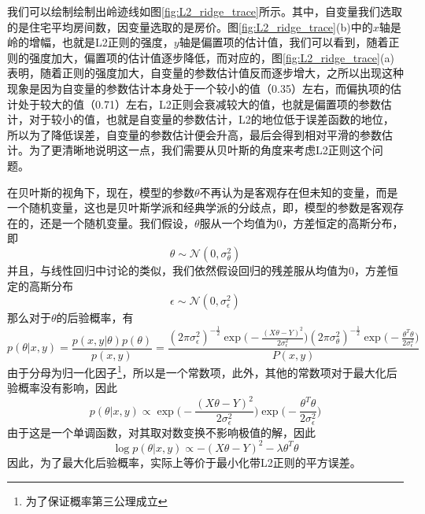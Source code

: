 

我们可以绘制绘制出岭迹线如图\ref{fig:L2_ridge_trace}所示。其中，自变量我们选取的是住宅平均房间数，因变量选取的是房价。图\ref{fig:L2_ridge_trace}(b)中的$x$轴是岭的增幅，也就是L2正则的强度，$y$轴是偏置项的估计值，我们可以看到，随着正则的强度加大，偏置项的估计值逐步降低，而对应的，图\ref{fig:L2_ridge_trace}(a)表明，随着正则的强度加大，自变量的参数估计值反而逐步增大，之所以出现这种现象是因为自变量的参数估计本身处于一个较小的值（0.35）左右，而偏执项的估计处于较大的值（0.71）左右，L2正则会衰减较大的值，也就是偏置项的参数估计，对于较小的值，也就是自变量的参数估计，L2的地位低于误差函数的地位，所以为了降低误差，自变量的参数估计便会升高，最后会得到相对平滑的参数估计。为了更清晰地说明这一点，我们需要从贝叶斯的角度来考虑L2正则这个问题。

在贝叶斯的视角下，现在，模型的参数$\theta$不再认为是客观存在但未知的变量，而是一个随机变量，这也是贝叶斯学派和经典学派的分歧点，即，模型的参数是客观存在的，还是一个随机变量。我们假设，$\theta$服从一个均值为0，方差恒定的高斯分布，即
\begin{equation}
	\theta \sim \mathcal{N}(0, \sigma_\theta^2)
\end{equation}
并且，与线性回归中讨论的类似，我们依然假设回归的残差服从均值为0，方差恒定的高斯分布
\begin{equation}
	\epsilon \sim \mathcal{N}(0, \sigma_\epsilon^2)
\end{equation}
那么对于$\theta$的后验概率，有
\begin{equation}
	p(\theta|x, y) = \frac{p(x, y| \theta)p(\theta)}{p(x, y)} 
	= \frac{(2\pi\sigma_\epsilon^2)^{-\frac{1}{2}}\exp\Big(-\frac{(X\theta - Y)^2}{2\sigma_\epsilon^2}\Big)
	(2\pi\sigma_\theta^2)^{-\frac{1}{2}}\exp\Big(-\frac{\theta^T\theta}{2\sigma_\epsilon^2}\Big)
	}{P(x, y)}
\end{equation}
由于分母为归一化因子\footnote{为了保证概率第三公理成立}，所以是一个常数项，此外，其他的常数项对于最大化后验概率没有影响，因此
\begin{equation}
	p(\theta|x, y) \propto
	\exp\Big(-\frac{(X\theta - Y)^2}{2\sigma_\epsilon^2}\Big)
	\exp\Big(-\frac{\theta^T\theta}{2\sigma_\epsilon^2}\Big)
\end{equation}
由于这是一个单调函数，对其取对数变换不影响极值的解，因此
\begin{equation}
	\log p(\theta|x, y) \propto
	-(X\theta - Y)^2
	-\lambda \theta^T\theta
\end{equation}
因此，为了最大化后验概率，实际上等价于最小化带L2正则的平方误差。

